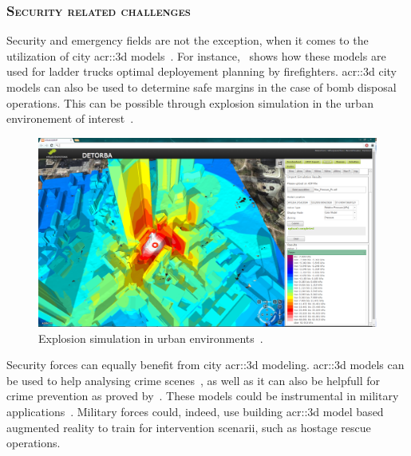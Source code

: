         \subsubsection{\textsc{Security related challenges}}
            Security and emergency fields are not the exception, when it comes to the utilization of city \gls{acr::3d} models~\parencite{kwan2005emergency, ruppel2011designing}.
            For instance,~\textcite{chen2014application} shows how these models are used for ladder trucks optimal deployement planning by firefighters.
            \gls{acr::3d} city models can also be used to determine safe margins in the case of bomb disposal operations.
            This can be possible through explosion simulation in the urban environement of interest~\parencite{willenborg2015simulation}.\\
            \begin{figure}[htpb]
                \centering
                \includegraphics[width=\textwidth]{images/introduction/3d_model_applications/explosion_simulation}            
                \caption{
                    \label{fig::explosion_simulation} Explosion simulation in urban environments~\parencite{ijgi4042842}.
                }
            \end{figure}
            Security forces can equally benefit from city \gls{acr::3d} modeling.
            \gls{acr::3d} models can be used to help analysing crime scenes~\parencite{wolff2009towards}, as well as it can also be helpfull for crime prevention as proved by~\textcite{wolff2008geospatial}.
            These models could be instrumental in military applications~\textcite{zlatanova2002trends, budroni2010automatic}.
            Military forces could, indeed, use building \gls{acr::3d} model based augmented reality to train for intervention scenarii, such as hostage rescue operations.

